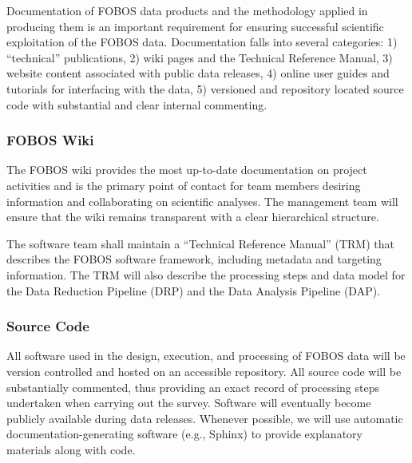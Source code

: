 \documentclass[preprint,11pt]{aastex}
\begin{document}
Documentation of FOBOS data products and the methodology applied in producing them is an important requirement for
ensuring successful scientific exploitation of the FOBOS data.  Documentation falls into several categories: 1) ``technical''
publications, 2) wiki pages and the Technical Reference Manual, 3) website content associated with public data
releases, 4) online user guides and tutorials for interfacing with the data, 5) versioned and repository located source
code with substantial and clear internal commenting.  

\subsubsection{FOBOS Wiki}

The FOBOS wiki provides the most up-to-date documentation on project activities and is the primary point of contact for
team members desiring information and collaborating on scientific analyses.  The management team will ensure that the
wiki remains transparent with a clear hierarchical structure.  

The software team shall maintain a ``Technical Reference Manual'' (TRM) that describes the FOBOS software framework, including metadata
and targeting information.  The TRM will also describe the processing
steps and data model for the Data Reduction Pipeline (DRP) and the Data
Analysis Pipeline (DAP).  


\subsubsection{Source Code}

All software used in the design, execution, and processing of FOBOS data will be version controlled and hosted on an
accessible repository.  All source code will be substantially commented, thus
providing an exact record of processing steps undertaken when carrying out the survey.  Software will eventually become
publicly available during data releases.  Whenever possible, we will use automatic documentation-generating software
(e.g., Sphinx) to provide explanatory materials along with code.






\end{document}
